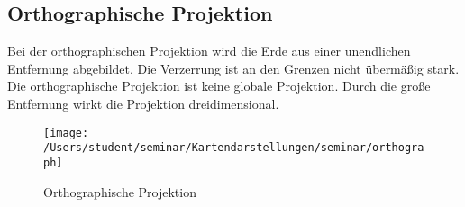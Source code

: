 \subsection{Orthographische Projektion}
\label{sec:ortographproj}
Bei der orthographischen Projektion wird die Erde aus einer unendlichen Entfernung abgebildet.
Die Verzerrung ist an den Grenzen nicht übermäßig stark. Die orthographische Projektion ist keine
globale Projektion. Durch die große Entfernung wirkt die Projektion dreidimensional.\\

\begin{figure}[hbtp]
\centering
\texttt{[image: /Users/student/seminar/Kartendarstellungen/seminar/orthograph]} \caption{Orthographische Projektion}
\end{figure}
\newpage 